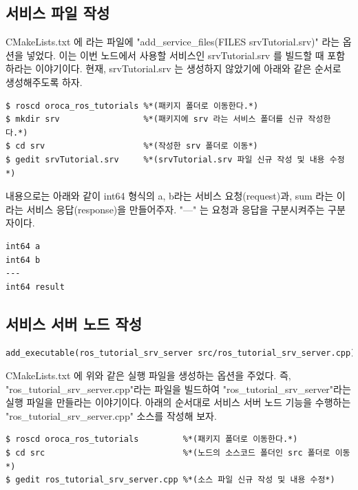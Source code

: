 \subsection{서비스 파일 작성}

CMakeLists.txt 에 라는 파일에 "add\_service\_files(FILES srvTutorial.srv)" 라는 옵션을 넣었다. 이는 이번 노드에서 사용할 서비스인 srvTutorial.srv 를 빌드할 때 포함하라는 이야기이다. 현재, srvTutorial.srv 는 생성하지 않았기에 아래와 같은 순서로 생성해주도록 하자.

\begin{lstlisting}[language=ROS]
$ roscd oroca_ros_tutorials %*(패키지 폴더로 이동한다.*)
$ mkdir srv                 %*(패키지에 srv 라는 서비스 폴더를 신규 작성한다.*)
$ cd srv                    %*(작성한 srv 폴더로 이동*)
$ gedit srvTutorial.srv     %*(srvTutorial.srv 파일 신규 작성 및 내용 수정*)
\end{lstlisting}

\noindent
내용으로는 아래와 같이 int64 형식의 a, b라는 서비스 요청(request)과, sum 라는 이라는 서비스 응답(response)을 만들어주자. "---" 는 요청과 응답을 구분시켜주는 구분자이다.

\begin{lstlisting}[language=ROS]
int64 a
int64 b
---
int64 result
\end{lstlisting}

\subsection{서비스 서버 노드 작성}

\begin{lstlisting}[language=make]
add_executable(ros_tutorial_srv_server src/ros_tutorial_srv_server.cpp)
\end{lstlisting}

CMakeLists.txt 에 위와 같은 실행 파일을 생성하는 옵션을 주었다. 즉, "ros\_tutorial\_srv\_server.cpp"라는 파일을 빌드하여 "ros\_tutorial\_srv\_server"라는 실행 파일을 만들라는 이야기이다. 아래의 순서대로 서비스 서버 노드 기능을 수행하는 "ros\_tutorial\_srv\_server.cpp" 소스를 작성해 보자. 

\begin{lstlisting}[language=ROS]
$ roscd oroca_ros_tutorials         %*(패키지 폴더로 이동한다.*)
$ cd src                            %*(노드의 소스코드 폴더인 src 폴더로 이동*)
$ gedit ros_tutorial_srv_server.cpp %*(소스 파일 신규 작성 및 내용 수정*)
\end{lstlisting}


